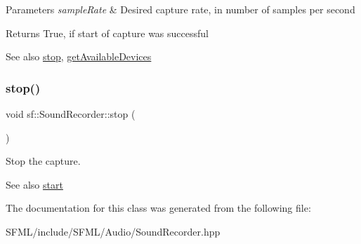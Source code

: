 \begin{DoxyParams}{Parameters}
{\em sample\+Rate} & Desired capture rate, in number of samples per second\\
\hline
\end{DoxyParams}
\begin{DoxyReturn}{Returns}
True, if start of capture was successful
\end{DoxyReturn}
\begin{DoxySeeAlso}{See also}
\mbox{\hyperlink{classsf_1_1_sound_recorder_a8d9c8346aa9aa409cfed4a1101159c4c}{stop}}, \mbox{\hyperlink{classsf_1_1_sound_recorder_a26198c5c11efcd61f426f326fe314afe}{get\+Available\+Devices}} \begin{DoxyVerb}\end{DoxyVerb}
 
\end{DoxySeeAlso}
\mbox{\label{classsf_1_1_sound_recorder_a8d9c8346aa9aa409cfed4a1101159c4c}} 
\subsubsection{\texorpdfstring{stop()}{stop()}}
{\footnotesize\ttfamily void sf\+::\+Sound\+Recorder\+::stop (\begin{DoxyParamCaption}{ }\end{DoxyParamCaption})}



Stop the capture. 

\begin{DoxySeeAlso}{See also}
\mbox{\hyperlink{classsf_1_1_sound_recorder_a715f0fd2f228c83d79aaedca562ae51f}{start}} \begin{DoxyVerb}\end{DoxyVerb}
 
\end{DoxySeeAlso}


The documentation for this class was generated from the following file\+:\begin{DoxyCompactItemize}
\item 
S\+F\+M\+L/include/\+S\+F\+M\+L/\+Audio/Sound\+Recorder.\+hpp\end{DoxyCompactItemize}
